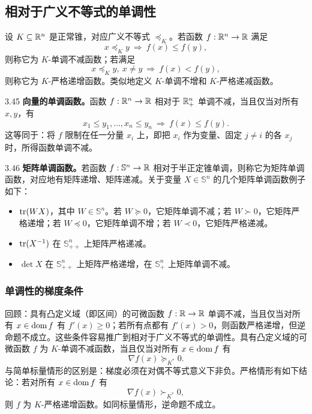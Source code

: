 \subsection{相对于广义不等式的单调性}
设 $K\subseteq\mathbb R^n$ 是正常锥，对应广义不等式 $\preceq_K$。若函数 $f:\mathbb R^n\to\mathbb R$ 满足
\[x\preceq_K y\ \Longrightarrow\ f(x)\leq f(y),\]
则称它为 $K$-单调不减函数；若满足
\[x\preceq_K y,\ x\ne y\ \Longrightarrow\ f(x)<f(y),\]
则称它为 $K$-严格递增函数。类似地定义 $K$-单调不增和 $K$-严格递减函数。
\begin{origexample}{3.45}
\textbf{向量的单调函数。}函数 $f:\mathbb R^n\to\mathbb R$ 相对于 $\mathbb R_+^n$ 单调不减，当且仅当对所有 $x,y$，有
\[x_1\leq y_1,\ldots,x_n\leq y_n\ \Longrightarrow\ f(x)\leq f(y).\]
这等同于：将 $f$ 限制在任一分量 $x_i$ 上，即把 $x_i$ 作为变量、固定 $j\ne i$ 的各 $x_j$ 时，所得函数单调不减。
\end{origexample}
\begin{origexample}{3.46}
\textbf{矩阵单调函数。}若函数 $f:\mathbb S^n\to\mathbb R$ 相对于半正定锥单调，则称它为矩阵单调函数，对应地有矩阵递增、矩阵递减。关于变量 $X\in\mathbb S^n$ 的几个矩阵单调函数例子如下：
\begin{itemize}
\item $\operatorname{tr}(WX)$，其中 $W\in\mathbb S^n$。若 $W\succeq0$，它矩阵单调不减；若 $W\succ0$，它矩阵严格递增；若 $W\preceq0$，它矩阵单调不增；若 $W\prec0$，它矩阵严格递减。
\item $\operatorname{tr}(X^{-1})$ 在 $\mathbb S_{++}^n$ 上矩阵严格递减。
\item $\det X$ 在 $\mathbb S_{++}^n$ 上矩阵严格递增，在 $\mathbb S_+^n$ 上矩阵单调不减。
\end{itemize}
\end{origexample}
\subsubsection*{单调性的梯度条件}
回顾：具有凸定义域（即区间）的可微函数 $f:\mathbb R\to\mathbb R$ 单调不减，当且仅当对所有 $x\in\operatorname{dom} f$ 有 $f'(x)\geq0$；若所有点都有 $f'(x)>0$，则函数严格递增，但逆命题不成立。这些条件容易推广到相对于广义不等式的单调性。具有凸定义域的可微函数 $f$ 为 $K$-单调不减函数，当且仅当对所有 $x\in\operatorname{dom} f$ 有
\begin{equation}\nabla f(x)\succeq_{K^*}0.\tag{3.24}\end{equation}
与简单标量情形的区别是：梯度必须在对偶不等式意义下非负。严格情形有如下结论：若对所有 $x\in\operatorname{dom} f$ 有
\begin{equation}\nabla f(x)\succ_{K^*}0,\tag{3.25}\end{equation}
则 $f$ 为 $K$-严格递增函数。如同标量情形，逆命题不成立。


